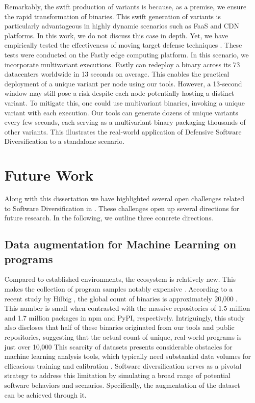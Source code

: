 Remarkably, the swift production of variants is because, as a premise, we ensure the rapid transformation of \Wasm binaries. 
This swift generation of variants is particularly advantageous in highly dynamic scenarios such as FaaS and CDN platforms. 
In this work, we do not discuss this case in depth. 
Yet, we have empirically tested the effectiveness of moving target defense techniques \cite{jackson2011compiler}. 
These tests were conducted on the Fastly edge computing platform.
In this scenario, we incorporate multivariant executions\cite{MEWE}. 
Fastly can redeploy a \Wasm binary across its 73 datacenters worldwide in 13 seconds on average. 
This enables the practical deployment of a unique variant per node using our tools. 
However, a 13-second window may still pose a risk despite each node potentially hosting a distinct \Wasm variant. 
To mitigate this, one could use multivariant binaries, invoking a unique variant with each execution. 
Our tools can generate dozens of unique variants every few seconds, each serving as a multivariant binary packaging thousands of other variants. 
This illustrates the real-world application of Defensive Software Diversification to a \Wasm standalone scenario.


\section{Future Work}

Along with this dissertation we have highlighted several open challenges related to Software Diversification in \Wasm.
These challenges open up several directions for future research.
In the following, we outline three concrete directions.


\vspace{-0.3cm}
\subsection{Data augmentation for Machine Learning on \Wasm programs}
Compared to established environments, the \Wasm ecosystem is relatively new. This makes the collection of \Wasm program samples notably expensive \cite{Hilbig2021AnES, 10174194}.
According to a recent study by Hilbig \etal, the global count of \Wasm binaries is approximately 20,000  \cite{Hilbig2021AnES}. 
This number is small when contrasted with the massive repositories of 1.5 million and 1.7 million packages in npm and PyPI, respectively. 
Intriguingly, this study also discloses that half of these \Wasm binaries originated from our tools and public repositories, suggesting that the actual count of unique, real-world \Wasm programs is just over 10,000
This scarcity of \Wasm datasets presents considerable obstacles for machine learning analysis tools, which typically need substantial data volumes for efficacious training and calibration \cite{2023arXiv230519915Z}.
Software diversification serves as a pivotal strategy to address this limitation by simulating a broad range of potential software behaviors and scenarios. 
Specifically, the augmentation of the \Wasm dataset can be achieved through it.

